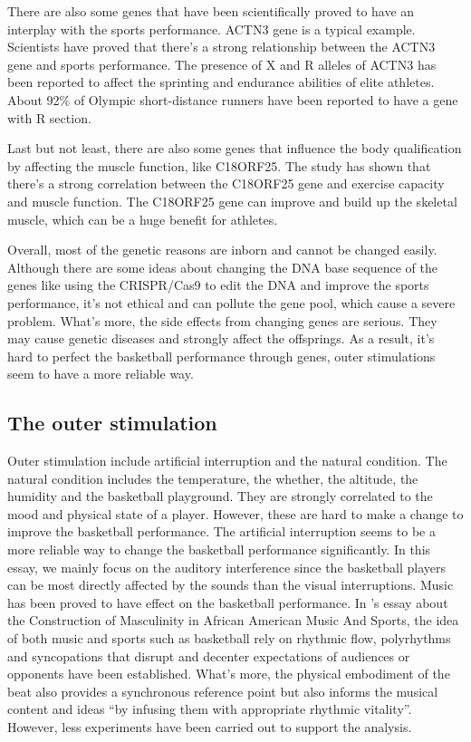\documentclass{article}
\begin{document}
There are also some genes that have been scientifically proved to have an interplay with the sports performance. ACTN3 gene is a typical example. Scientists have proved that there's a strong relationship between the ACTN3 gene and sports performance. The presence of X and R alleles of ACTN3 has been reported to affect the sprinting and endurance abilities of elite athletes. About 92\% of Olympic short-distance runners have been reported to have a gene with R section.\autocite{goelACTN3AthleteGene2007}

Last but not least, there are also some genes that influence the body qualification by affecting the muscle function, like C18ORF25. The study has shown that there's a strong correlation between the C18ORF25 gene and exercise capacity and muscle function. The C18ORF25 gene can improve and build up the skeletal muscle, which can be a huge benefit for athletes.\autocite{blazevPhosphoproteomicsThreeExercise2022}

Overall, most of the genetic reasons are inborn and cannot be changed easily. Although there are some ideas about changing the DNA base sequence of the genes like using the CRISPR/Cas9 to edit the DNA and improve the sports performance, it's not ethical and can pollute the gene pool, which cause a severe problem. What's more, the side effects from changing genes are serious. They may cause genetic diseases and strongly affect the offsprings. As a result, it's hard to perfect the basketball performance through genes, outer stimulations seem to have a more reliable way. 

\subsection{The outer stimulation}
Outer stimulation include artificial interruption and the natural condition. The natural condition includes the temperature, the whether, the altitude, the humidity and the basketball playground. They are strongly correlated to the mood and physical state of a player. However, these are hard to make a change to improve the basketball performance. The artificial interruption seems to be a more reliable way to change the basketball performance significantly. In this essay, we mainly focus on the auditory interference since the basketball players can be most directly affected by the sounds than the visual interruptions. \todo{()} Music has been proved to have effect on the basketball performance. In \textcite{mcleodConstructionMasculinityAfrican2009}'s essay about the Construction of Masculinity in African American Music And Sports, the idea of both music and sports such as basketball rely on rhythmic flow, polyrhythms and syncopations that disrupt and decenter expectations of audiences or opponents have been established. What's more, the physical embodiment of the beat also provides a synchronous reference point but also informs the musical content and ideas ``by infusing them with appropriate rhythmic vitality''. However, less experiments have been carried out to support the analysis. 
\end{document}
